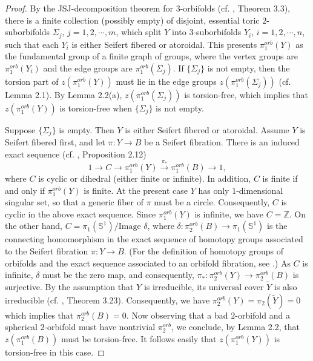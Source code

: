 \documentclass[11pt]{amsart}
\theoremstyle{plain}
\numberwithin{theorem}{section}
\theoremstyle{definition}
\begin{document}
\begin{proof}
By the JSJ-decomposition theorem for $3$-orbifolds (cf. \cite{BMP}, Theorem 3.3), there is a finite
collection (possibly empty) of disjoint, essential toric $2$-suborbifolds $\Sigma_j$, $j=1,2,\cdots,m$, 
which split $Y$ into $3$-suborbifolds $Y_i$, $i=1,2,\cdots,n$, such that each $Y_i$ is either Seifert fibered or atoroidal. This presents $\pi_1^{orb}(Y)$ as the fundamental group of a finite graph of groups, where the vertex groups are $\pi_1^{orb}(Y_i)$ and the edge groups are $\pi_1^{orb}(\Sigma_j)$. If $\{\Sigma_j\}$ is not empty, then the torsion part of $z(\pi_1^{orb}(Y))$ must lie in the edge groups 
$z(\pi_1^{orb}(\Sigma_j))$ (cf. Lemma 2.1). By Lemma 2.2(a), 
$z(\pi_1^{orb}(\Sigma_j))$ is torsion-free, which implies that $z(\pi_1^{orb}(Y))$ is torsion-free 
when $\{\Sigma_j\}$ is not empty.

Suppose $\{\Sigma_j\}$ is empty. Then $Y$ is either Seifert fibered or atoroidal. Assume $Y$ is 
Seifert fibered first, and let $\pi: Y\rightarrow B$ be a Seifert fibration. There is an induced exact sequence (cf. \cite{BMP}, Proposition 2.12)
$$
1 \rightarrow C \rightarrow\pi_1^{orb}(Y)\stackrel{\pi_\ast}{\rightarrow}\pi_1^{orb}(B)\rightarrow 1,
$$
where $C$ is cyclic or dihedral (either finite or infinite). In addition, $C$ is finite if and only if 
$\pi_1^{orb}(Y)$ is finite. At the present case $Y$ has only $1$-dimensional singular set, so that 
a generic fiber of $\pi$ must be a circle. Consequently, $C$ is cyclic in the above exact sequence. Since 
$\pi_1^{orb}(Y)$ is infinite, we have $C={{\mathbb Z}}$. On the other hand, $C=\pi_1({{\mathbb S}}^1)/
\text{Image }\delta$, where $\delta:\pi_2^{orb}(B)\rightarrow \pi_1({{\mathbb S}}^1)$ is the connecting homomorphism in the exact sequence of homotopy groups associated to the Seifert fibration $\pi: Y\rightarrow B$. 
(For the definition of homotopy groups of orbifolds and the exact sequence associated to an orbifold fibration, see \cite{Hae1, Hae2, C0}.) As $C$ is infinite, $\delta$ must be the zero map, and consequently, 
$\pi_\ast:\pi_2^{orb}(Y)\rightarrow \pi_2^{orb}(B)$ is surjective. By the assumption that 
$Y$ is irreducible, its universal cover $\tilde{Y}$ is also irreducible (cf. \cite{BMP}, Theorem 3.23).
Consequently, we have $\pi_2^{orb}(Y)=\pi_2(\tilde{Y})=0$ which implies that 
$\pi_2^{orb}(B)=0$. Now observing that a bad $2$-orbifold and a spherical $2$-orbifold must have 
nontrivial $\pi_2^{orb}$, we conclude, by Lemma 2.2, that $z(\pi_1^{orb}(B))$ must be torsion-free.
It follows easily that $z(\pi_1^{orb}(Y))$ is torsion-free in this case. 


\end{proof}
\end{document}
